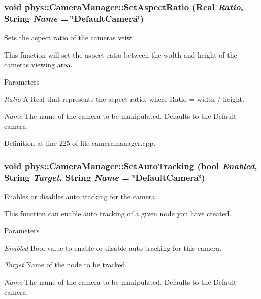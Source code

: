 \hypertarget{classphys_1_1CameraManager_af16862039fffd900b9c7acc20527cac8}{
\subsubsection[{SetAspectRatio}]{\setlength{\rightskip}{0pt plus 5cm}void phys::CameraManager::SetAspectRatio ({\bf Real} {\em Ratio}, \/  {\bf String} {\em Name} = {\ttfamily \char`\"{}DefaultCamera\char`\"{}})}}
\label{d9/d91/classphys_1_1CameraManager_af16862039fffd900b9c7acc20527cac8}


Sets the aspect ratio of the cameras veiw. 

This function will set the aspect ratio between the width and height of the cameras viewing area. 
\begin{DoxyParams}{Parameters}
\item[{\em Ratio}]A Real that represents the aspect ratio, where Ratio = width / height. \item[{\em Name}]The name of the camera to be manipulated. Defaults to the Default camera. \end{DoxyParams}


Definition at line 225 of file cameramanager.cpp.

\hypertarget{classphys_1_1CameraManager_a6edd94b6e8d9f2fa1e0b84554b367933}{
\subsubsection[{SetAutoTracking}]{\setlength{\rightskip}{0pt plus 5cm}void phys::CameraManager::SetAutoTracking (bool {\em Enabled}, \/  {\bf String} {\em Target}, \/  {\bf String} {\em Name} = {\ttfamily \char`\"{}DefaultCamera\char`\"{}})}}
\label{d9/d91/classphys_1_1CameraManager_a6edd94b6e8d9f2fa1e0b84554b367933}


Enables or disables auto tracking for the camera. 

This function can enable auto tracking of a given node you have created. 
\begin{DoxyParams}{Parameters}
\item[{\em Enabled}]Bool value to enable or disable auto tracking for this camera. \item[{\em Target}]Name of the node to be tracked. \item[{\em Name}]The name of the camera to be manipulated. Defaults to the Default camera. \end{DoxyParams}


